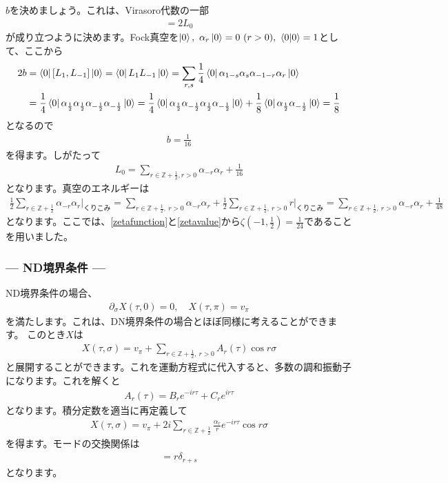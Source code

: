 \documentclass[report,paper=a4, fontsize=12pt, line_length=16cm, number_of_lines=34,dvipdfmx]{jlreq}
\numberwithin{equation}{chapter}
\numberwithin{equation}{section}
\newcommand{\Zb}{\mathbb{Z}}
\newcommand{\del}{\partial}
\newcommand{\Zbh}{\Zb+\frac12}
\begin{document}
$b$を決めましょう。これは、Virasoro代数の一部
\begin{align}
  [L_{1},L_{-1}]=2L_0
\end{align}
が成り立つように決めます。Fock真空を$\ket{0},\ \alpha_{r}\ket{0}=0\ (r>0),\ \braket{0}{0}=1$として、ここから
\begin{align}
  2b
  &=\bra{0}[L_{1},L_{-1}]\ket{0}
  =\bra{0}L_{1}L_{-1}\ket{0}
  =\sum_{r,s}\frac14\bra{0}\alpha_{1-s}\alpha_{s}\alpha_{-1-r}\alpha_{r}\ket{0}\nonumber\\
  &
  =\frac14\bra{0}\alpha_{\frac12}\alpha_{\frac12}\alpha_{-\frac12}\alpha_{-\frac12}\ket{0}
  =\frac14\bra{0}\alpha_{\frac12}\alpha_{-\frac12}\alpha_{\frac12}\alpha_{-\frac12}\ket{0}
  +\frac18\bra{0}\alpha_{\frac12}\alpha_{-\frac12}\ket{0}
  =\frac18
\end{align}
となるので
\begin{align}
  b=\frac{1}{16}
\end{align}
を得ます。しがたって
\begin{align}
  L_{0}=\sum_{r\in \Zbh,r>0}\alpha_{-r}\alpha_{r}+\frac{1}{16}
\end{align}
となります。真空のエネルギーは
\begin{align}
  \frac12 \sum_{r\in \Zbh}\alpha_{-r}\alpha_{r}\Bigg|_{\text{くりこみ}}
  =
  \sum_{r\in \Zbh,\ r>0}\alpha_{-r}\alpha_{r}
  +\frac12 \sum_{r\in \Zbh,\ r>0}r\Bigg|_{\text{くりこみ}}
  =
  \sum_{r\in \Zbh,\ r>0}\alpha_{-r}\alpha_{r}
  +\frac{1}{48}
\end{align}
となります。ここでは、\eqref{zetafunction}と\eqref{zetavalue}から$\zeta(-1,\frac12)=\frac{1}{24}$であることを用いました。

\subsubsection*{--- ND境界条件 ---}
ND境界条件の場合、
\begin{align}
  \del_{\sigma}X(\tau,0)=0,\quad X(\tau,\pi)=v_{\pi}
\end{align}
を満たします。これは、DN境界条件の場合とほぼ同様に考えることができます。
このとき$X$は
\begin{align}
  X(\tau,\sigma)=v_{\pi}+\sum_{r\in \Zbh,\ r>0}A_{r}(\tau)\cos r\sigma
\end{align}
と展開することができます。これを運動方程式に代入すると、多数の調和振動子になります。これを解くと
\begin{align}
  A_{r}(\tau)=B_{r}e^{-ir\tau}+C_{r}e^{ir\tau}
\end{align}
となります。積分定数を適当に再定義して
\begin{align}
  X(\tau,\sigma)=v_{\pi}+2i\sum_{r\in \Zbh}\frac{\alpha_{r}}{r}e^{-ir\tau}\cos r\sigma
\end{align}
を得ます。モードの交換関係は
\begin{align}
  [\alpha_{r},\alpha_{s}]=r\delta_{r+s}
\end{align}
となります。
\end{document}
